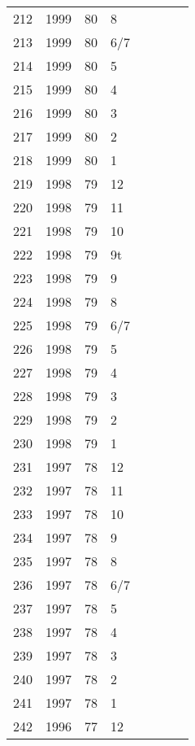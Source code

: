 \begin{longtable}{ |l|l|l|l|l|l|l|l| }
212 & 1999 & 80 &     8 &         &  &  & \\
213 & 1999 & 80 &   6/7 &         &  &  & \\
214 & 1999 & 80 &     5 &         &  &  & \\
215 & 1999 & 80 &     4 &         &  &  & \\
216 & 1999 & 80 &     3 &         &  &  & \\
217 & 1999 & 80 &     2 &         &  &  & \\
218 & 1999 & 80 &     1 &         &  &  & \\
219 & 1998 & 79 &    12 &         &  &  & \\
220 & 1998 & 79 &    11 &         &  &  & \\
221 & 1998 & 79 &    10 &         &  &  & \\
222 & 1998 & 79 &    9t &         &  &  & \\
223 & 1998 & 79 &     9 &         &  &  & \\
224 & 1998 & 79 &     8 &         &  &  & \\
225 & 1998 & 79 &   6/7 &         &  &  & \\
226 & 1998 & 79 &     5 &         &  &  & \\
227 & 1998 & 79 &     4 &         &  &  & \\
228 & 1998 & 79 &     3 &         &  &  & \\
229 & 1998 & 79 &     2 &         &  &  & \\
230 & 1998 & 79 &     1 &         &  &  & \\
231 & 1997 & 78 &    12 &         &  &  & \\
232 & 1997 & 78 &    11 &         &  &  & \\
233 & 1997 & 78 &    10 &         &  &  & \\
234 & 1997 & 78 &     9 &         &  &  & \\
235 & 1997 & 78 &     8 &         &  &  & \\
236 & 1997 & 78 &   6/7 &         &  &  & \\
237 & 1997 & 78 &     5 &         &  &  & \\
238 & 1997 & 78 &     4 &         &  &  & \\
239 & 1997 & 78 &     3 &         &  &  & \\
240 & 1997 & 78 &     2 &         &  &  & \\
241 & 1997 & 78 &     1 &         &                &  & \\
242 & 1996 & 77 &    12 &         &                &  & \\

\end{longtable}
